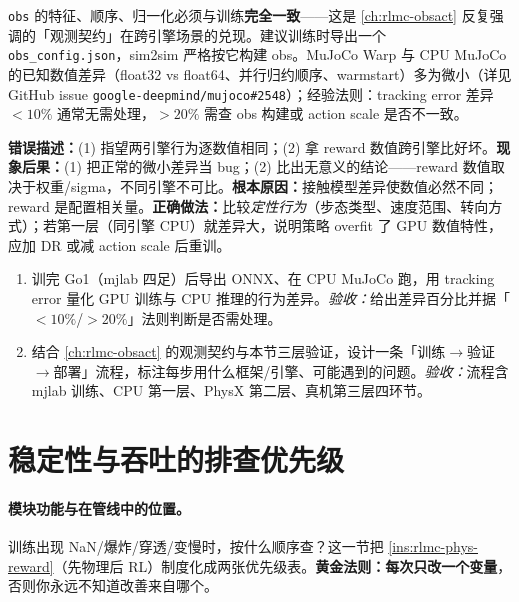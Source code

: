 \begin{note}
\verb|obs| 的特征、顺序、归一化必须与训练\textbf{完全一致}——这是 \cref{ch:rlmc-obsact} 反复强调的「观测契约」在跨引擎场景的兑现。建议训练时导出一个 \verb|obs_config.json|，sim2sim 严格按它构建 obs。MuJoCo Warp 与 CPU MuJoCo 的已知数值差异（float32 vs float64、并行归约顺序、warmstart）多为微小（详见 GitHub issue \verb|google-deepmind/mujoco#2548|）；经验法则：tracking error 差异 $<10\%$ 通常无需处理，$>20\%$ 需查 obs 构建或 action scale 是否不一致。
\end{note}

\begin{pitfall}
\textbf{错误描述：}(1) 指望两引擎行为逐数值相同；(2) 拿 reward 数值跨引擎比好坏。\textbf{现象后果：}(1) 把正常的微小差异当 bug；(2) 比出无意义的结论——reward 数值取决于权重/sigma，不同引擎不可比。\textbf{根本原因：}接触模型差异使数值必然不同；reward 是配置相关量。\textbf{正确做法：}比较\emph{定性行为}（步态类型、速度范围、转向方式）；若第一层（同引擎 CPU）就差异大，说明策略 overfit 了 GPU 数值特性，应加 DR 或减 action scale 后重训。
\end{pitfall}

\begin{practice}[本节练习]
\begin{enumerate}
  \item 训完 Go1（mjlab 四足）后导出 ONNX、在 CPU MuJoCo 跑，用 tracking error 量化 GPU 训练与 CPU 推理的行为差异。\emph{验收：}给出差异百分比并据「$<10\%$/$>20\%$」法则判断是否需处理。
  \item 结合 \cref{ch:rlmc-obsact} 的观测契约与本节三层验证，设计一条「训练$\to$验证$\to$部署」流程，标注每步用什么框架/引擎、可能遇到的问题。\emph{验收：}流程含 mjlab 训练、CPU 第一层、PhysX 第二层、真机第三层四环节。
\end{enumerate}
\end{practice}

\section{稳定性与吞吐的排查优先级}
\label{sec:rlmc-phys-stability}

\paragraph{模块功能与在管线中的位置。}训练出现 NaN/爆炸/穿透/变慢时，按什么顺序查？这一节把 \cref{ins:rlmc-phys-reward}（先物理后 RL）制度化成两张优先级表。\textbf{黄金法则：每次只改一个变量}，否则你永远不知道改善来自哪个。

